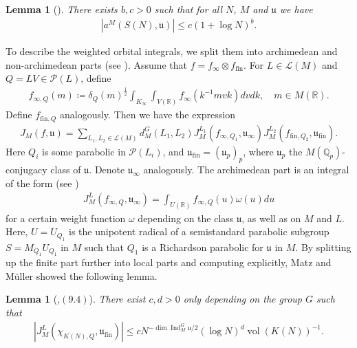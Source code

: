 \documentclass[11pt,reqno]{amsart}
\numberwithin{equation}{section}
\newtheorem{lem}[thm]{Lemma}
\theoremstyle{definition}
\theoremstyle{remark}
\newcommand{\Q}{\mathbb{Q}}
\newcommand{\vol}{\operatorname{vol}}
\renewcommand{\dim}{\operatorname{dim}}
\newcommand{\Ind}{\operatorname{Ind}}
\newcommand{\mf}[1]{\mathfrak{#1}}
\newcommand{\R}{\mathbb{R}}
\begin{document}
\begin{lem}[\cite{Matz}]\label{coeffbound}
    There exists $b,c>0$ such that for all $N$, $M$ and $\mf{u}$ we have
    \begin{align*}
        |a^M(S(N),\mf{u})|\leq c(1+\log N)^b.
    \end{align*}
\end{lem}

\noindent To describe the weighted orbital integrals, we split them into archimedean and non-archimedean parts (see \cite{Arthur3}). Assume that $f=f_\infty\otimes f_{\text{fin}}$. For $L\in\mathcal{L}(M)$ and $Q=LV\in\mathcal{P}(L)$, define
\begin{align}\label{subq}
    f_{\infty,Q}(m) \coloneqq \delta_Q(m)^{\frac12}\int_{K_\infty}\int_{V(\R)}f_\infty(k^{-1}mvk)dv dk, \quad m\in M(\R).
\end{align}
Define $f_{\text{fin},Q}$ analogously. Then we have the expression
\begin{align}\label{localparts}
    J_M(f,\mf{u}) = \sum_{L_1,L_2\in\mathcal{L}(M)} d_M^G(L_1,L_2)J^{L_1}_M(f_{\infty,Q_1},\mf{u}_\infty)J_M^{L_2}(f_{\text{fin},Q_2},\mf{u}_{\text{fin}}).
\end{align}
Here $Q_i$ is some parabolic in $\mathcal{P}(L_i)$, and $\mf{u}_{\text{fin}}=(\mf{u}_p)_p$, where $\mf{u}_p$ the $M(\Q_p)$-conjugacy class of $\mf{u}$. Denote $\mf{u}_\infty$ analogously. The archimedean part is an integral of the form (see \cite{Arthur1})
\begin{align}\label{archilocalorbint}
    J^{L}_M(f_{\infty,Q},\mf{u}_\infty) = \int_{U(\R)}f_{\infty,Q}(u)\omega(u) du
\end{align}
for a certain weight function $\omega$ depending on the class $\mf{u}$, as well as on $M$ and $L$. Here, $U=U_{Q_1}$ is the unipotent radical of a semistandard parabolic subgroup $S=M_{Q_1}U_{Q_1}$ in $M$ such that ${Q_1}$ is a Richardson parabolic for $\mf{u}$ in $M$. By splitting up the finite part further into local parts and computing explicitly, Matz and Müller showed the following lemma.
\begin{lem}[\cite{MzM2},$(9.4)$]\label{localbound}
There exist $c,d>0$ only depending on the group $G$ such that
    \begin{align*}
   \left\vert J_M^L(\chi_{{K(N)},Q},\mf{u}_{\text{fin}})\right\vert \leq c N^{-\dim\Ind^G_M \mf{u}/2}(\log N)^d\vol(K(N))^{-1}.
\end{align*}
\end{lem}
\end{document}
